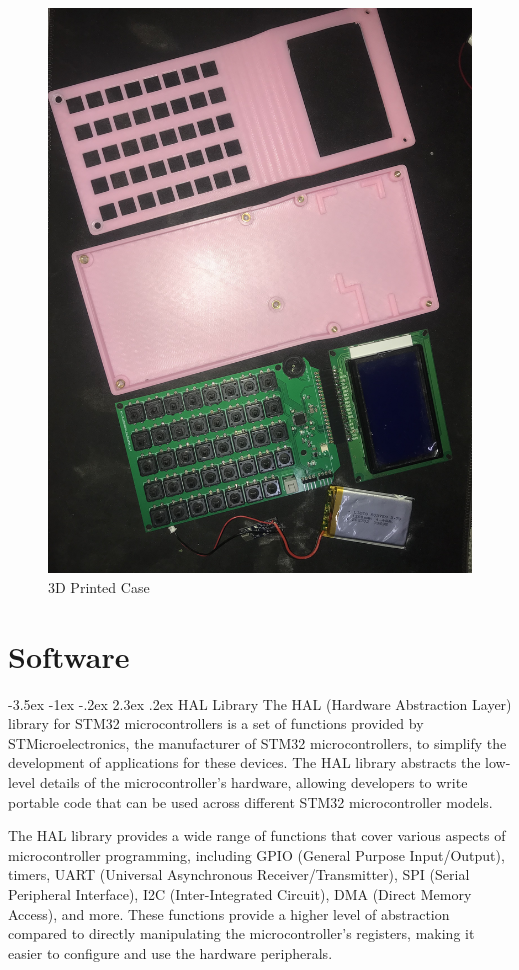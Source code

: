 \documentclass[a4paper, twoside]{report}
\makeatletter
\renewcommand\section{\@startsection {section}{1}{-1em}%
  {-3.5ex \@plus -1ex \@minus -.2ex}%
  {2.3ex \@plus.2ex}%
  {\normalfont\Large\bfseries}}
\makeatother
\begin{document}
\begin{figure}[H]
    \centering
    \includegraphics[width=.6\textwidth]{3DCase/3dprinted.jpeg}
    \caption{3D Printed Case}
\end{figure}

\chapter{Software}
\section{HAL Library}
The HAL (Hardware Abstraction Layer) library for STM32 microcontrollers is a set of functions provided by STMicroelectronics, the manufacturer of STM32 microcontrollers, to simplify the development of applications for these devices. The HAL library abstracts the low-level details of the microcontroller's hardware, allowing developers to write portable code that can be used across different STM32 microcontroller models.

The HAL library provides a wide range of functions that cover various aspects of microcontroller programming, including GPIO (General Purpose Input/Output), timers, UART (Universal Asynchronous Receiver/Transmitter), SPI (Serial Peripheral Interface), I2C (Inter-Integrated Circuit), DMA (Direct Memory Access), and more. These functions provide a higher level of abstraction compared to directly manipulating the microcontroller's registers, making it easier to configure and use the hardware peripherals.
\end{document}

